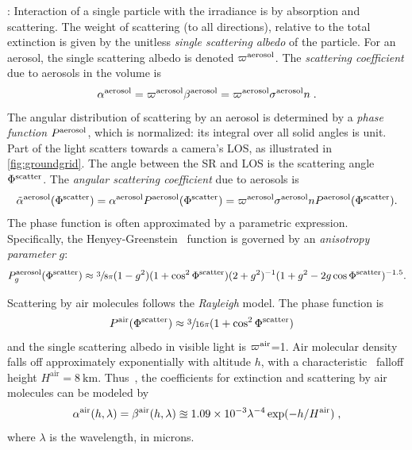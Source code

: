 \documentclass[10pt,letterpaper]{article}
\begin{document}
: Interaction of a single particle with the
irradiance is by absorption and scattering. The weight of scattering
(to all directions), relative to the total extinction is given by the
unitless {\em single scattering albedo} of the particle. For an
aerosol, the single scattering albedo is denoted $\varpi^{\rm
  aerosol}$.  The {\em scattering coefficient} due to aerosols in the
volume is
\begin{align}
  \alpha^{\rm aerosol}= \varpi^{\rm aerosol}\beta^{\rm aerosol}
  =\varpi^{\rm aerosol} \sigma^{\rm aerosol} n \;.
  \label{eq:alph}
\end{align}
The angular distribution of scattering by an aerosol is determined by
a {\em phase function} $P^{\rm aerosol}$, which is normalized: its
integral over all solid angles is unit. Part of the light scatters
towards a camera's LOS, as illustrated in \cref{fig:groundgrid}. The
angle between the SR and LOS is the scattering angle $\Phi^{\rm
  scatter}$. The {\em angular scattering coefficient} due to aerosols
is
\begin{align}
  \tilde\alpha^{\rm aerosol}(\Phi^{\rm scatter}) = \alpha^{\rm
    aerosol} P^{\rm aerosol}(\Phi^{\rm scatter}) = \varpi^{\rm
    aerosol} \sigma^{\rm aerosol} n P^{\rm aerosol}(\Phi^{\rm
    scatter}).
  \label{eq:alphabasic}
\end{align}
The phase function is often approximated by a parametric
expression. Specifically, the Henyey-Greenstein~\cite{Cornette1995}
function is governed by an {\em anisotropy parameter} $g$:
\begin{align}
  P^{\rm aerosol}_g(\Phi^{\rm scatter})\approx \sfrac{3}{8\pi} (1 -
  g^2)(1+\cos^2\Phi^{\rm scatter}) (2+g^2)^{-1}(1 + g^2 -
  2g\cos\Phi^{\rm scatter})^{-1.5}.
  \label{eq:aerosol_scatter}
\end{align}


Scattering by air molecules follows the {\em Rayleigh} model. The
phase function is
\begin{align}
  P^{\rm air}(\Phi^{\rm scatter}) &\approx
  \sfrac{3}{16\pi}(1+\cos^2\Phi^{\rm scatter})
  \label{eq:rayleighP}
\end{align}
and the single scattering albedo in visible light is $\varpi^{\rm
  air}$=1. Air molecular density falls off approximately exponentially
with altitude $h$, with a characteristic~\cite{Levi1980} falloff
height $H^\mathrm{air}=8\ \si{\km}$. Thus~\cite{Levi1980}, the
coefficients for extinction and scattering by air molecules can be
modeled by
\begin{align}
  \alpha^{\rm air}(h, \lambda)=\beta^{\rm air}(h, \lambda) \approxeq
  1.09 \times 10^{-3}\lambda^{-4} \exp(-h/H^\mathrm{air})
  \;,%
  \label{eq:rayleighbeta}
\end{align}
where $\lambda$ is the wavelength, in microns.
\\
\end{document}
